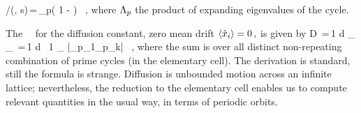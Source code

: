 /\zeta(\beta, s)\,=\,\prod_{p}\left( 1 -  \right) ~,
\label{zeta-diff}
\eeq
where $\Lambda_p$ the product of expanding eigenvalues of the
cycle.

The \dzeta\ \cycForm\ for the diffusion constant, zero mean drift
$ \langle { \hat{x}_i } \rangle = 0 \,, $ is given by
 \beq 
 D \,=\,{1  d} { _\zeta \over
 \expct{\period{}}_\zeta } \,=\,{1  d } \, {1 \over
 \expct{\period{}}_\zeta} \sumprime {} {|\ExpaEig_{p_1}\cdots \ExpaEig_{p_k}|} \, ,
\label{eq-ecDiffCoef}
\eeq
where the sum is over all distinct non-repeating combination of prime
cycles (in the elementary cell). The derivation is standard, still the
formula is strange. Diffusion is unbounded motion across an infinite
lattice; nevertheless, the reduction to the elementary cell enables us
to compute relevant quantities in the usual way, in terms of periodic
orbits.
